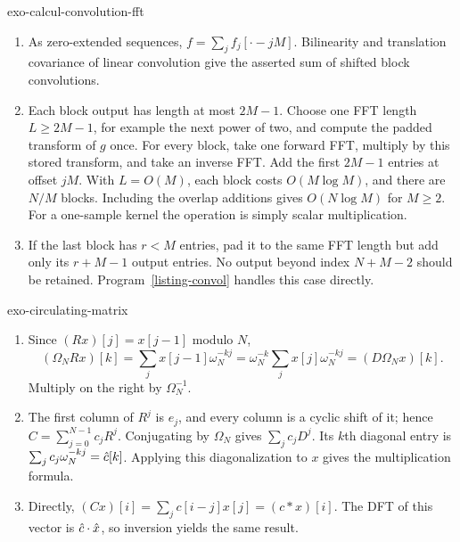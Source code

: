 \begin{correction}{exo-calcul-convolution-fft}
\begin{enumerate}
\item As zero-extended sequences,
$f=\sum_jf_j[\cdot-jM]$. Bilinearity and translation covariance of linear
convolution give the asserted sum of shifted block convolutions.
\item Each block output has length at most $2M-1$.
Choose one FFT length $L\geq2M-1$, for example the next power of two,
and compute the padded transform of $g$ once.
For every block, take one forward FFT, multiply by this stored transform,
and take an inverse FFT. Add the first $2M-1$ entries at offset $jM$.
With $L=O(M)$, each block costs $O(M\log M)$, and there are $N/M$ blocks.
Including the overlap additions gives $O(N\log M)$ for $M\geq2$.
For a one-sample kernel the operation is simply scalar multiplication.
\item If the last block has $r<M$ entries, pad it to the same FFT length
but add only its $r+M-1$ output entries. No output beyond index $N+M-2$
should be retained. Program~\ref{listing-convol} handles this case directly.
\begin{listing}[H]
\caption{Overlap-add convolution, including an incomplete final block.}
\label{listing-convol}
\end{listing}
\end{enumerate}
\end{correction}

\begin{correction}{exo-circulating-matrix}
\begin{enumerate}
\item Since $(Rx)[j]=x[j-1]$ modulo $N$,
\[
 (\Omega_NRx)[k]=\sum_jx[j-1]\omega_N^{-kj}
 =\omega_N^{-k}\sum_jx[j]\omega_N^{-kj}=(D\Omega_Nx)[k].
\]
Multiply on the right by $\Omega_N^{-1}$.
\item The first column of $R^j$ is $e_j$, and every column is a cyclic
shift of it; hence $C=\sum_{j=0}^{N-1}c_jR^j$.
Conjugating by $\Omega_N$ gives $\sum_jc_jD^j$.
Its $k$th diagonal entry is $\sum_jc_j\omega_N^{-kj}=\hat{c}[k]$.
Applying this diagonalization to $x$ gives the multiplication formula.
\item Directly,
$(Cx)[i]=\sum_jc[i-j]x[j]=(c*x)[i]$.
The DFT of this vector is $\hat{c}\cdot\hat{x}$, so inversion yields the same result.
\end{enumerate}
\end{correction}

